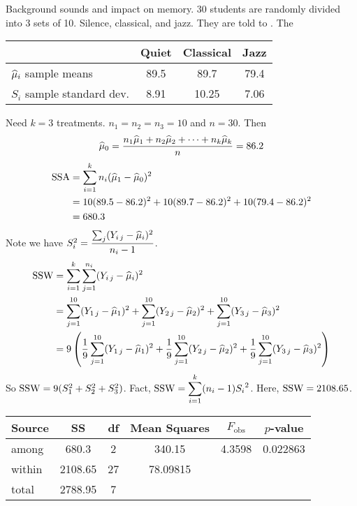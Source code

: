 \example Background sounds and impact on memory. 30 students are randomly divided into 3 sets of 10. Silence, classical, and jazz. They are told to . The 
\begin{center}
    \begin{tabular}{|l|c c c|}
         \hline
          & Quiet & Classical & Jazz\\
         \hline
        $\widehat{\mu}_i$ sample means & 89.5 & 89.7 & 79.4\\
        $S_i$ sample standard dev. & 8.91 & 10.25 & 7.06\\
         \hline
    \end{tabular}
\end{center}
Need $k=3$ treatments. $n_1 = n_2 = n_3 = 10$ and $n=30$. Then
$$\widehat{\mu}_0 = \frac{
    n_1 \widehat{\mu}_1 + n_2 \widehat{\mu}_2 + \cdots + n_k \widehat{\mu}_k
}{n} = 86.2$$
\begin{align*}
    \operatorname{SSA} &= \sum_{i=1}^k n_i (\widehat{\mu}_1 - \widehat{\mu}_0)^2\\
    &= 10(89.5-86.2)^2 + 10(89.7-86.2)^2 + 10(79.4-86.2)^2\\ &= 680.3
\end{align*}
Note we have $S_i^2 = \dfrac{\sum_j (Y_{i\,j} - \widehat{\mu}_i)^2}{n_i -1}$.
\begin{align*}
    \SSW &= \sum_{i=1}^k \sum_{j=1}^{n_i} (Y_{i\,j} - \muh_i)^2\\
    &= \sum_{j=1}^{10} (Y_{1\,j} - \muh_1)^2 + \sum_{j=1}^{10} (Y_{2\,j} - \muh_2)^2 + \sum_{j=1}^{10} (Y_{3\,j} - \muh_3)^2\\
    &= 9 \pars{ \over{9} \sum_{j=1}^{10} (Y_{1\,j} - \muh_1)^2 + \over{9} \sum_{j=1}^{10} (Y_{2\,j} - \muh_2)^2 + \over{9} \sum_{j=1}^{10} (Y_{3\,j} - \muh_3)^2}
\end{align*}
So $\operatorname{SSW} = 9(S_1^2 + S_2^2 + S_3^2)$. Fact, $\displaystyle \operatorname{SSW} = \sum_{i=1}^k (n_i-1) {S_i}^2$.
Here, $\operatorname{SSW} = 2108.65$.
\begin{center}
    \begin{tabular}{|l|c c c c c|}
         \hline
         Source & SS & df & Mean Squares & $F_{\text{obs}}$ & $p$-value\\
         \hline
         among & 680.3 & 2 & 340.15 & 4.3598 & 0.022863\\
         within & 2108.65 & 27  & 78.09815 & & \\
         total & 2788.95 & 7 & & &\\
         \hline
    \end{tabular}
\end{center}

